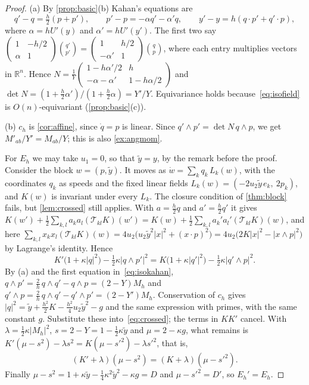 \documentclass[11pt,a4paper]{article}
\theoremstyle{definition}
\theoremstyle{remark}
\newcommand{\R}{\mathbb{R}}
\newcommand{\T}{\mathcal{T}}
\begin{document}
\begin{proof}
(a) By \cref{prop:basic}(b) Kahan's equations are
\begin{equation}\label{eq:isokahan}
q'-q=\tfrac h2(p+p'),\qquad p'-p=-\alpha q'-\alpha'q,\qquad y'-y=h(q\cdot p'+q'\cdot p),
\end{equation}
where $\alpha=hU'(y)$ and $\alpha'=hU'(y')$. The first two say
$\left(\begin{smallmatrix}1&-h/2\\ \alpha&1\end{smallmatrix}\right)\binom{q'}{p'}
=\left(\begin{smallmatrix}1&h/2\\-\alpha'&1\end{smallmatrix}\right)\binom qp$, where each entry multiplies
vectors in $\R^n$. Hence
$N=\frac1Y\left(\begin{smallmatrix}1-h\alpha'/2&h\\-\alpha-\alpha'&1-h\alpha/2\end{smallmatrix}\right)$ and
$\det N=(1+\frac h2\alpha')/(1+\frac h2\alpha)=Y'/Y$. Equivariance holds because~\eqref{eq:isofield} is
$O(n)$-equivariant (\cref{prop:basic}(c)).

(b) $c_h$ is \cref{cor:affine}, since $\dot q=p$ is linear. Since $q'\wedge p'=\det N\,q\wedge p$, we get
$M'_{ab}/Y'=M_{ab}/Y$; this is also \cref{ex:angmom}.

For $E_h$ we may take $u_1=0$, so that $\tilde y=y$, by the remark before the proof. Consider the block
$w=(p,\tilde y)$. It moves as $\dot w=\sum_kq_k\,L_k(w)$, with the coordinates $q_k$
as speeds and the fixed linear fields $L_k(w)=(-2u_2\tilde y\,e_k,\ 2p_k)$, and $K(w)$ is invariant under every
$L_k$. The closure condition of \cref{thm:block} fails, but \cref{lem:crossed} still applies. With
$a=\frac h2q$ and $a'=\frac h2q'$ it gives
$K(w')+\frac12\sum_{k,l}a_ka_l(\T_{kl}K)(w')=K(w)+\frac12\sum_{k,l}a_k'a_l'(\T_{kl}K)(w)$, and here
$\sum_{k,l}x_kx_l(\T_{kl}K)(w)=4u_2\big(u_2\tilde y^2\lvert x\rvert^2+(x\cdot p)^2\big)
=4u_2\big(2K\lvert x\rvert^2-\lvert x\wedge p\rvert^2\big)$ by Lagrange's identity. Hence
\begin{equation}\label{eq:crossed}
K'\big(1+\kappa\lvert q\rvert^2\big)-\tfrac12\kappa\lvert q\wedge p'\rvert^2
=K\big(1+\kappa\lvert q'\rvert^2\big)-\tfrac12\kappa\lvert q'\wedge p\rvert^2 .
\end{equation}
By (a) and the first equation in~\eqref{eq:isokahan}, $q\wedge p'=\frac2h\,q\wedge q'-q\wedge p=(2-Y)M_h$ and
$q'\wedge p=\frac2h\,q\wedge q'-q'\wedge p'=(2-Y')M_h$. Conservation of $c_h$ gives
$\lvert q\rvert^2=\tilde y+\frac{h^2}2K-\frac{h^2}4u_2\tilde y^2-g$ and the same expression with primes, with the
same constant $g$. Substitute these into~\eqref{eq:crossed}; the terms in $KK'$ cancel. With
$\lambda=\frac12\kappa\lvert M_h\rvert^2$, $s=2-Y=1-\frac12\kappa\tilde y$ and $\mu=2-\kappa g$, what remains is
$K'(\mu-s^2)-\lambda s^2=K(\mu-s'^2)-\lambda s'^2$, that is,
\[
(K'+\lambda)(\mu-s^2)=(K+\lambda)(\mu-s'^2).
\]
Finally $\mu-s^2=1+\kappa\tilde y-\frac14\kappa^2\tilde y^2-\kappa g=D$ and $\mu-s'^2=D'$, so $E_h'=E_h$.


\end{proof}
\end{document}
